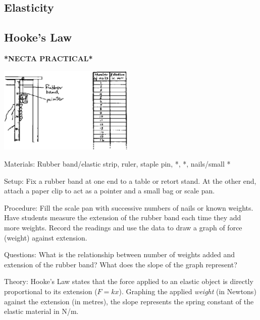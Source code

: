\begin{multicols}{2}

\section*{Elasticity}


\subsection{Hooke's Law}
\textbf{*NECTA PRACTICAL*}
\begin{center}
\includegraphics[width=0.49\textwidth]{./img/source/elasticity.png}
\end{center}

\begin{description*}
\item[Materials:]{Rubber band/elastic strip, ruler, staple pin, *, *, nails/small *}
\item[Setup:]{Fix a rubber band at one end to a table or retort stand. At the other end, attach a paper clip to act as a pointer and a small bag or scale pan.}
\item[Procedure:]{Fill the scale pan with successive numbers of nails or known weights. Have students measure the extension of the rubber band each time they add more weights. Record the readings and use the data to draw a graph of force (weight) against extension.}
\item[Questions:]{What is the relationship between number of weights added and extension of the rubber band? What does the slope of the graph represent?}
\item[Theory:]{Hooke's Law states that the force applied to an elastic object is directly proportional to its extension ($F = kx$). Graphing the applied \emph{weight} (in Newtons) against the extension (in metres), the slope represents the spring constant of the elastic material in N/m. }
\end{description*}


\end{multicols}

